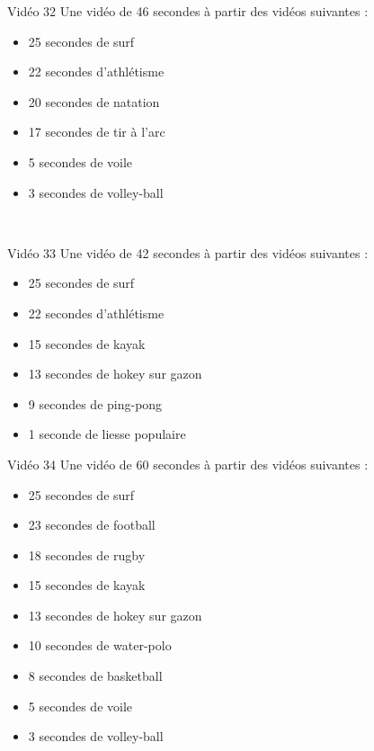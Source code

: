 \documentclass[10pt, a5paper,twoside]{article}
\begin{document}
\vfill

\begin{card}[width = \textwidth, colback = olympicviolet, colframe = olympicviolet, bottomtitle = 2mm]{Vidéo 32}
  Une vidéo de 46 secondes à partir des vidéos suivantes :
  \vspace{-1mm}\begin{itemize}
    \item 25 secondes de surf
    \item 22 secondes d'athlétisme
    \item 20 secondes de natation
    \item 17 secondes de tir à l'arc
    \item 5 secondes de voile
    \item 3 secondes de volley-ball
  \end{itemize}
\end{card}

\vfill

\clearpage
~
\vfill

\begin{card}[width = \textwidth, colback = olympicviolet, colframe = olympicviolet, bottomtitle = 2mm]{Vidéo 33}
  Une vidéo de 42 secondes à partir des vidéos suivantes :
  \vspace{-1mm}\begin{itemize}
    \item 25 secondes de surf
    \item 22 secondes d'athlétisme
    \item 15 secondes de kayak
    \item 13 secondes de hokey sur gazon
    \item 9 secondes de ping-pong
    \item 1 seconde de liesse populaire
  \end{itemize}
\end{card}

\vfill

\begin{card}[width = \textwidth, colback = olympicviolet, colframe = olympicviolet, bottomtitle = 2mm]{Vidéo 34}
  Une vidéo de 60 secondes à partir des vidéos suivantes :
  \vspace{-1mm}\begin{itemize}
    \item 25 secondes de surf
    \item 23 secondes de football
    \item 18 secondes de rugby
    \item 15 secondes de kayak
    \item 13 secondes de hokey sur gazon
    \item 10 secondes de water-polo
    \item 8 secondes de basketball
    \item 5 secondes de voile
    \item 3 secondes de volley-ball
  \end{itemize}
\end{card}
\end{document}
